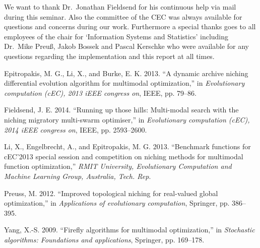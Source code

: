 \documentclass[12pt,a4paper]{article}
\begin{document}
We want to thank Dr.~Jonathan Fieldsend for his continuous help via mail
during this seminar. Also the committee of the CEC was always available
for questions and concerns during our work. Furthermore a special thanks
goes to all employees of the chair for `Information Systems and
Statistics' including Dr.~Mike Preuß, Jakob Bossek and Pascal Kerschke
who were available for any questions regarding the implementation and
this report at all times. \newpage

\hypertarget{refs}{}
\hypertarget{ref-epitropakisux5f2013}{}
Epitropakis, M. G., Li, X., and Burke, E. K. 2013. ``A dynamic archive
niching differential evolution algorithm for multimodal optimization,''
in \emph{Evolutionary computation (cEC), 2013 iEEE congress on}, IEEE,
pp. 79--86.

\hypertarget{ref-fieldsendux5f2014}{}
Fieldsend, J. E. 2014. ``Running up those hills: Multi-modal search with
the niching migratory multi-swarm optimiser,'' in \emph{Evolutionary
computation (cEC), 2014 iEEE congress on}, IEEE, pp. 2593--2600.

\hypertarget{ref-liux5f2013}{}
Li, X., Engelbrecht, A., and Epitropakis, M. G. 2013. ``Benchmark
functions for cEC'2013 special session and competition on niching
methods for multimodal function optimization,'' \emph{RMIT University,
Evolutionary Computation and Machine Learning Group, Australia, Tech.
Rep}.

\hypertarget{ref-preussux5f2012}{}
Preuss, M. 2012. ``Improved topological niching for real-valued global
optimization,'' in \emph{Applications of evolutionary computation},
Springer, pp. 386--395.

\hypertarget{ref-yangux5f2009}{}
Yang, X.-S. 2009. ``Firefly algorithms for multimodal optimization,'' in
\emph{Stochastic algorithms: Foundations and applications}, Springer,
pp. 169--178.
\end{document}

